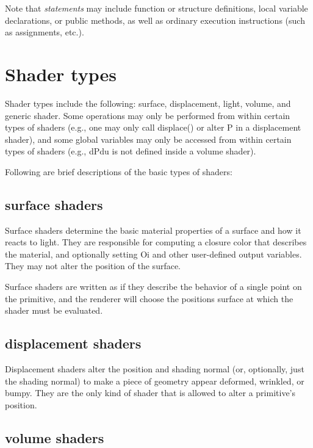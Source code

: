 \documentclass[11pt,letterpaper]{book}
\def\opacity{{\cf Oi}\xspace}
\def\P{{\cf P}\xspace}
\def\colorclosure{{\cf closure color}\xspace}
\begin{document}
Note that \emph{statements} may include function or structure
definitions, local variable declarations, or public methods, as well as
ordinary execution instructions (such as assignments, etc.).

\section{Shader types}
\label{sec:shadertypes}
 

Shader types include the following: {\cf surface}, {\cf displacement},
{\cf light}, {\cf volume}, and generic {\cf shader}.  Some operations
may only be performed from within certain types of shaders (e.g., one
may only call {\cf displace()} or alter \P in a displacement shader),
and some global variables may only be accessed from within certain types
of shaders (e.g., {\cf dPdu} is not defined inside a volume shader).

Following are brief descriptions of the basic types of shaders:


\subsection*{{\cf surface} shaders}

Surface shaders determine the basic material properties of a surface and
how it reacts to light.  They are responsible for computing a
\colorclosure that describes the material, and optionally setting
\opacity and other user-defined output variables.  They may not alter
the position of the surface.

Surface shaders are written as if they describe the behavior of a single
point on the primitive, and the renderer will choose the positions
surface at which the shader must be evaluated.

\subsection*{{\cf displacement} shaders}

Displacement shaders alter the position and shading normal (or,
optionally, just the shading normal) to make a piece of geometry appear
deformed, wrinkled, or bumpy.  They are the only kind of shader that
is allowed to alter a primitive's position.

\subsection*{{\cf volume} shaders}
\end{document}
